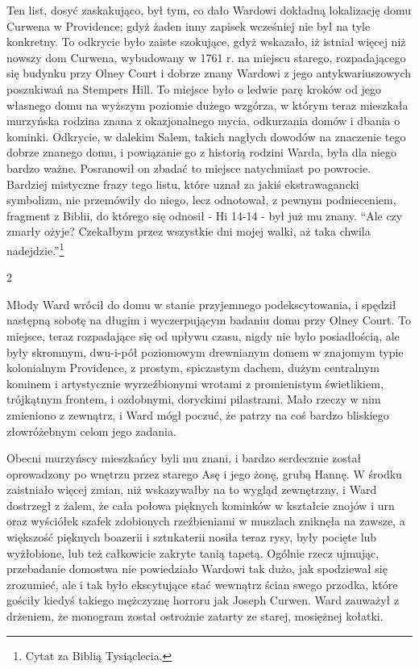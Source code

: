 Ten list, dosyć zaskakująco, był tym, co dało Wardowi dokładną lokalizację domu Curwena w Providence; gdyż żaden inny zapisek wcześniej nie był na tyle konkretny. To odkrycie było zaiste szokujące, gdyż wskazało, iż istniał więcej niż nowszy dom Curwena, wybudowany w 1761 r. na miejscu starego, rozpadającego się budynku przy Olney Court i dobrze znany Wardowi z jego antykwariuszowych poszukiwań na Stempers Hill. To miejsce było o ledwie parę kroków od jego własnego domu na wyższym poziomie dużego wzgórza, w którym teraz mieszkała murzyńska rodzina znana z okazjonalnego mycia, odkurzania domów i dbania o kominki. Odkrycie, w dalekim Salem, takich nagłych dowodów na znaczenie tego dobrze znanego domu, i powiązanie go z historią rodzini Warda, była dla niego bardzo ważne. Posranowił on zbadać to miejsce natychmiast po powrocie. Bardziej mistyczne frazy tego listu, które uznał za jakiś ekstrawagancki symbolizm, nie przemówiły do niego, lecz odnotował, z pewnym podnieceniem, fragment z Biblii, do którego się odnosił - Hi 14-14 - był już mu znany. ``Ale czy zmarły ożyje? Czekałbym przez wszystkie dni mojej walki, aż taka chwila nadejdzie.''\footnote{Cytat za Biblią Tysiąclecia.}

\begin{center}
2
\end{center}

Młody Ward wrócił do domu w stanie przyjemnego podekscytowania, i spędził następną sobotę na długim i wyczerpującym badaniu domu przy Olney Court. To miejsce, teraz rozpadające się od upływu czasu, nigdy nie było posiadłością, ale były skromnym, dwu-i-pół poziomowym drewnianym domem w znajomym typie kolonialnym Providence, z prostym, spiczastym dachem, dużym centralnym kominem i artystycznie wyrzeźbionymi wrotami z promienistym świetlikiem, trójkątnym frontem, i ozdobnymi, doryckimi pilastrami. Mało rzeczy w nim zmieniono z zewnątrz, i Ward mógł poczuć, że patrzy na coś bardzo bliskiego złowróżebnym celom jego zadania.

Obecni murzyńscy mieszkańcy byli mu znani, i bardzo serdecznie został oprowadzony po wnętrzu przez starego Asę i jego żonę, grubą Hannę. W środku zaistniało więcej zmian, niż wskazywałby na to wygląd zewnętrzny, i Ward dostrzegł z żalem, że cała połowa pięknych kominków w kształcie znojów i urn oraz wyściółek szafek zdobionych rzeźbieniami w muszlach zniknęła na zawsze, a większość pięknych boazerii i sztukaterii nosiła teraz rysy, były pocięte lub wyżłobione, lub też całkowicie zakryte tanią tapetą. Ogólnie rzecz ujmując, przebadanie domostwa nie powiedziało Wardowi tak dużo, jak spodziewał się zrozumieć, ale i tak było ekscytujące stać wewnątrz ścian swego przodka, które gościły kiedyś takiego mężczyznę horroru jak Joseph Curwen. Ward zauważył z drżeniem, że monogram został ostrożnie zatarty ze starej, mosiężnej kołatki.   

